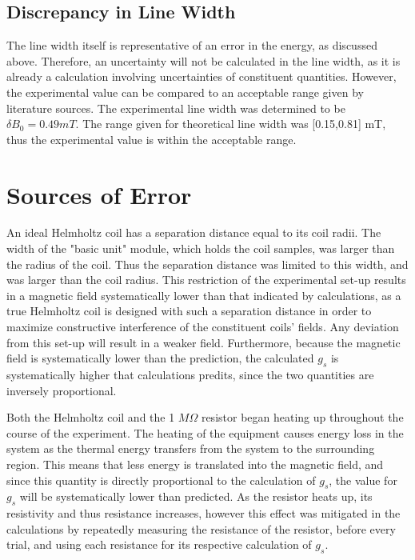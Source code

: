 \documentclass[a4paper]{article}
\begin{document}
\subsection{Discrepancy in Line Width}
\qq The line width itself is representative of an error in the energy,
as discussed above. Therefore, an uncertainty will not be calculated
in the line width, as it is already a calculation involving
uncertainties of constituent quantities. However, the experimental
value can be compared to an acceptable range given by literature
sources. The experimental line width was determined to be $\delta B_0
= 0.49 mT$. The range given for theoretical line width was [0.15,0.81]
mT, thus the experimental value is within the acceptable range.

\section{Sources of Error}
\qq An ideal Helmholtz coil has a separation distance equal to its coil radii. The width of the "basic unit" module, which holds
the coil samples, was larger than the radius of the coil. Thus the
separation distance was limited to this width, and was larger than the coil radius. This restriction of the experimental set-up results in a magnetic field systematically lower than that indicated by calculations, as a true Helmholtz coil is
designed with such a separation distance in order to maximize constructive interference of the constituent coils' fields. Any deviation from this set-up will result in a weaker field.  Furthermore,
because the magnetic field is systematically lower than the
prediction, the calculated $g_s$ is systematically higher that calculations predits, since the two quantities are inversely proportional.

\qq Both the Helmholtz coil and the 1 $M \Omega$ resistor began heating up throughout the course of the experiment. The heating of the equipment
causes energy loss in the system as the
thermal energy transfers from the system to the surrounding region. This means that less energy is translated into the magnetic field, and since this quantity is directly proportional to the calculation of $g_s$, the value for $g_s$ will be systematically lower than predicted. As the
resistor heats up, its resistivity and thus resistance increases, however this effect was mitigated in the calculations by repeatedly measuring the resistance of the resistor, before every trial, and using each resistance for its respective calculation of $g_s$.
\end{document}
